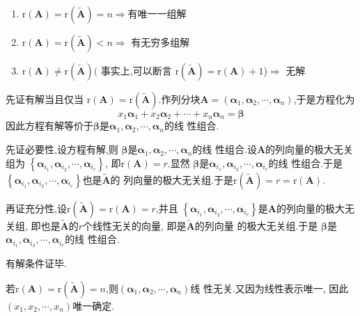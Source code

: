 \begin{formal}
\begin{theorem}[判定定理]
    \begin{enumerate}[label=\textup{(\arabic*)}]
      \item $ \mathrm{r}\left(\bm{A}\right)  
      =\mathrm{r}\left(\widetilde{\bm{A}}
      \right) = n\Longrightarrow 
        $有唯一一组解
      \item $\mathrm{r}\left(\bm{A}\right)  
      =\mathrm{r}\left(\widetilde{\bm{A}}
      \right) < n \Longrightarrow $
        有无穷多组解
      \item $\mathrm{r}\left(\bm{A}\right)
      \neq \mathrm{r}\left(
        \widetilde{\bm{A}}
      \right)($
        事实上,可以断言
      $\mathrm{r}\left(
        \widetilde{\bm{A}
      }\right) = 
      \mathrm{r}\left(\bm{A}\right) + 1
      $)$\Longrightarrow $
      无解
    \end{enumerate}
\end{theorem}
\begin{Proof}
先证有解当且仅当
$ \mathrm{r}\left(\bm{A}\right)  
      =\mathrm{r}\left(\widetilde{\bm{A}}
      \right)$.作列分块$\bm{A}=\left(\bm{\alpha}_1,
      \bm{\alpha}_2,\cdots,\bm{\alpha}_n
      \right)$,于是方程化为
      \[
      x_1\bm{\alpha}_1+x_2\bm{\alpha}_2+\cdots+x_n\bm{\alpha}_n
      =\bm{\beta}
      \]
因此方程有解等价于$\bm{\beta}$是$\bm{\alpha}_1,
\bm{\alpha}_2,\cdots,\bm{\alpha}_n$的线
性组合.

先证必要性,设方程有解,则
$\bm{\beta}$是$\bm{\alpha}_1,
\bm{\alpha}_2,\cdots,\bm{\alpha}_n$的线
性组合.设$\bm{A}$的列向量的极大无关组为
$\left\{\bm{\alpha}_{i_1},\bm{\alpha}_{i_2}
,\cdots,\bm{\alpha}_{i_r}\right\}$,
即$\mathrm{r}\left(\bm{A}\right)=r$.显然
$\bm{\beta}$是$\bm{\alpha}_{i_1},
\bm{\alpha}_{i_2},\cdots,\bm{\alpha}_{i_r}
$的线
性组合.于是
$\left\{\bm{\alpha}_{i_1},
\bm{\alpha}_{i_2},\cdots,\bm{\alpha}_{i_r}
\right\}$也是$\widetilde{\bm{A}}$的
列向量的极大无关组.于是$\mathrm{r}\left(\widetilde{\bm{A}}\right)=r=\mathrm{r}\left(\bm{A}\right).
$

再证充分性,设$\mathrm{r}\left(\widetilde{\bm{A}}\right)=
\mathrm{r}\left(\bm{A}\right)=r$,并且
$\left\{\bm{\alpha}_{i_1},\bm{\alpha}_{i_2},
\cdots,\bm{\alpha}_{i_r}\right\}$是$\bm{A}$的列向量的极大无关组,
即也是$\widetilde{\bm{A}}$的$
r$个线性无关的向量,
即是$\widetilde{\bm{A}}$的列向量
的极大无关组.于是
$\bm{\beta}$是$\bm{\alpha}_{i_1},
\bm{\alpha}_{i_2},\cdots,\bm{\alpha}_{i_r}
$的线
性组合.

有解条件证毕.

若$\mathrm{r}\left(\bm{A}\right)=\mathrm{r}\left(
    \widetilde{\bm{A}}
\right)=n$,则$\left(\bm{\alpha}_1,
\bm{\alpha}_2,\cdots,\bm{\alpha}_n\right)$线
性无关.又因为线性表示唯一,
因此$\left(x_1,x_2,\cdots,x_n\right)$唯一确定.


\end{Proof}
\end{formal}
